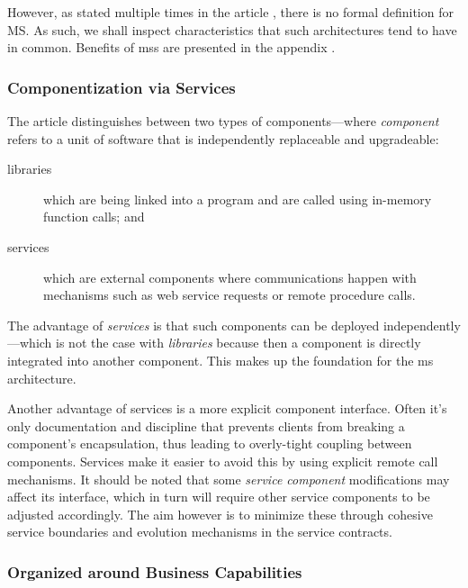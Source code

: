However, as stated multiple times in the article \cite{ms-definition},
there is no formal definition for MS. As such, we shall inspect
characteristics that such architectures tend to have in common.
Benefits of \glspl{ms} are presented in the appendix
.

\subsubsection{Componentization via Services}
\label{sec:componentization}

The article \cite{ms-definition} distinguishes between two types of
components---where \textit{component} refers to a unit of software
that is independently replaceable and upgradeable:

\begin{description}
	\item[libraries] which are being linked into a program and are
		called using in-memory function calls; and
	\item[services] which are external components where communications
		happen with mechanisms such as web service requests or remote
		procedure calls.
\end{description}

The advantage of \textit{services} is that such components can be
deployed independently---which is not the case with \textit{libraries}
because then a component is directly integrated into another
component. This makes up the foundation for the \gls{ms} architecture.

Another advantage of services is a more explicit component interface.
Often it's only documentation and discipline that prevents clients
from breaking a component's encapsulation, thus leading to
overly-tight coupling between components. Services make it easier to
avoid this by using explicit remote call mechanisms.
\cite{ms-definition}
It should be noted that some \textit{service component}
modifications may affect its interface, which in turn will require
other service components to be adjusted accordingly. The aim however
is to minimize these through cohesive service boundaries and evolution
mechanisms in the service contracts. \cite{ms-definition}

\subsubsection{Organized around Business Capabilities}
\label{sec:business-capabilities}

